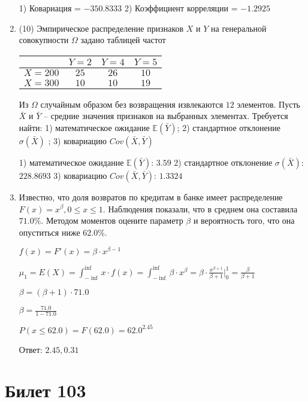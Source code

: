 \documentclass[a4paper,12pt]{article}
\begin{document}
\begin{enumerate}
1) Ковариация = $-350.8333$
2) Коэффициент корреляции = $-1.2925$


\item


(10) Эмпирическое распределение признаков $X$ и $Y$ на генеральной совокупности $\Omega$ задано таблицей частот  
 
\begin{tabular}{ | c | c | c | c | }
\hline
 & $Y = 2$ & $Y = 4$ & $Y = 5$  \\ \hline
$X = 200$ & $25$ & $26$ & $10$\\ \hline
$X = 300$ & $10$ & $10$ & $19$\\
\hline
\end{tabular}

Из $\Omega$ случайным образом без возвращения извлекаются $12$ элементов. 
Пусть $\bar X$ и $\bar Y$ – средние значения признаков на выбранных элементах. 
Требуется найти: 1) математическое ожидание $\mathbb{E}(\bar Y)$; 2) стандартное отклонение $\sigma(\bar X)$ ; 
3) ковариацию $Cov(\bar X, \bar Y)$




1) математическое ожидание $\mathbb{E}(\bar Y)$: $3.59$ 
2) стандартное отклонение $\sigma(\bar X)$: $228.8693$
3) ковариацию $Cov(\bar X, \bar Y)$: $1.3324$


\item

    
	Известно, что доля возвратов по кредитам в банке имеет распределение $F(x) = x^{\beta}, 0 \le x \le 1$. Наблюдения показали, что в среднем она составила $71.0$\%. Методом моментов оцените параметр $\beta$ и вероятность того, что она опуститься ниже $62.0$\%.
	


	

	$f(x) = F'(x) = \beta \cdot x^{\beta - 1}$

	$\mu_{1} = E(X) = \int_{-\inf}^{\inf}x \cdot f(x) = \int_{-\inf}^{\inf} \beta \cdot x^{\beta} = \beta \cdot \frac{x^{\beta + 1}}{\beta + 1}\bigg|_0^1 = \frac{\beta}{\beta + 1}$

	$\beta = (\beta + 1) \cdot 71.0$

	$\beta = \frac{71.0}{1 - 71.0}$

	$ P(x \le 62.0) = F(62.0) = 62.0^{2.45} $

    Ответ: $2.45, 0.31$
	


\end{enumerate}

\section{Билет 103}
\end{document}
